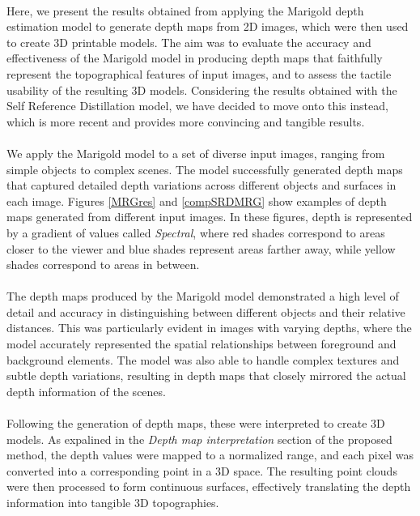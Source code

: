 \documentclass[12pt, letterpaper]{article}
\begin{document}
\begin{spacing}{1.15}
\paragraph{}
Here, we present the results obtained from applying the Marigold depth estimation model to generate depth maps from 2D images, which were then used to create 3D printable models.
The aim was to evaluate the accuracy and effectiveness of the Marigold model in producing depth maps that faithfully represent the topographical features of input images, and to assess
the tactile usability of the resulting 3D models. Considering the results obtained with the Self Reference Distillation model, we have decided to move onto this instead, which is more recent and provides more
convincing and tangible results.

\paragraph{}
We apply the Marigold model to a set of diverse input images, ranging from simple objects to complex scenes. The model successfully generated depth maps that captured detailed depth
variations across different objects and surfaces in each image. Figures \ref{MRGres} and \ref{compSRDMRG} show examples of depth maps generated from different input images. In these figures, depth is represented
by a gradient of values called \emph{Spectral}, where red shades correspond to areas closer to the viewer and blue shades represent areas farther away, while yellow shades correspond to areas
in between.

\paragraph{}
The depth maps produced by the Marigold model demonstrated a high level of detail and accuracy in distinguishing between different objects and their relative distances.
This was particularly evident in images with varying depths, where the model accurately represented the spatial relationships between foreground and background elements.
The model was also able to handle complex textures and subtle depth variations, resulting in depth maps that closely mirrored the actual depth information of the scenes.

\paragraph{}
Following the generation of depth maps, these were interpreted to create 3D models. As expalined in the \emph{Depth map interpretation} section of the proposed method, the
depth values were mapped to a normalized range, and each pixel was converted into a corresponding point in a 3D space. The resulting point clouds were then processed to form
continuous surfaces, effectively translating the depth information into tangible 3D topographies.


\end{spacing}
\end{document}
